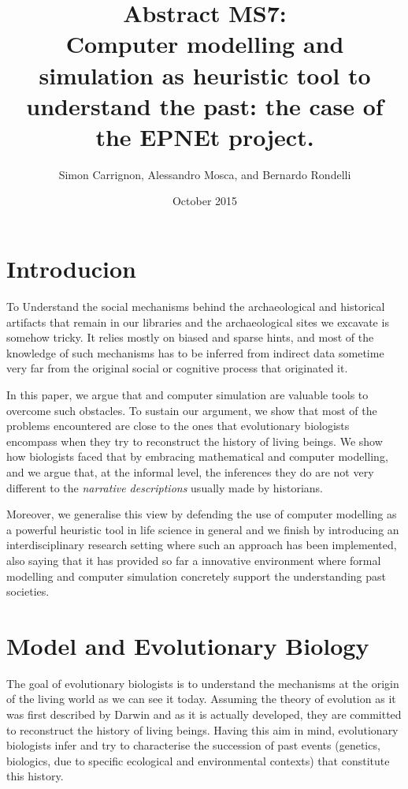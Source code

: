 \documentclass[a4paper]{article}
\title{Abstract MS7:\\ Computer modelling and simulation as heuristic tool to understand the past: the case of the EPNEt project.}
\author{Simon Carrignon, Alessandro Mosca, and Bernardo Rondelli}
\date{October 2015}
\begin{document}
\maketitle 


\section{Introducion}
To Understand the social mechanisms behind the archaeological and historical artifacts that remain in our libraries and the archaeological sites we excavate is somehow tricky. It relies mostly on biased and sparse hints, and most of the knowledge of such mechanisms has to be inferred from indirect data sometime very far from the original social or cognitive process that originated it.

In this paper, we argue that  and computer simulation are valuable tools to overcome such obstacles. To sustain our argument, we show that most of the problems encountered are close to the ones that evolutionary biologists encompass when they try to reconstruct the history of living beings. We show how biologists faced that by embracing mathematical and computer modelling, and we argue that, at the informal level, the inferences they do are not very different to the \emph{narrative descriptions} usually made by historians.

Moreover, we  generalise this view by defending the use of computer modelling as a powerful heuristic tool in life science in general and we finish by introducing an interdisciplinary research setting where such an approach has been implemented, also saying that it has provided so far a innovative environment where formal modelling and computer simulation concretely support the understanding past societies.

\section{Model and Evolutionary Biology }
The goal of evolutionary biologists is to understand the mechanisms at the origin of the living world as we can see it today. Assuming the theory of evolution as it was first described by Darwin and as it is actually developed, they are committed to reconstruct the history of living beings. Having this aim in mind, evolutionary biologists infer and try to characterise the succession of past events (genetics, biologics, due to specific ecological and environmental contexts) that constitute this history. 
\end{document}

